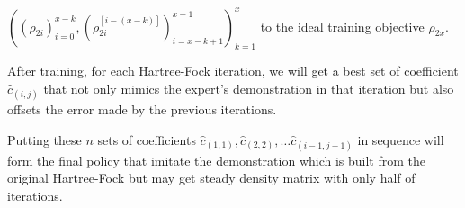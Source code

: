 \documentclass[twoside]{article}
\begin{document}
$((\rho_{2i})_{i=0}^{x-k} ,(\rho_{2i}^{[i-(x-k)]})^{x-1}_{i=x-k+1})_{k=1}^{x}$  
to the ideal training objective $\rho_{2x}$.
%

After training, for each Hartree-Fock iteration, we will get a best set of coefficient $\hat{c}_{(i,j)}$ that not only mimics the expert's demonstration in that iteration but also offsets the error made by the previous iterations.

% 
Putting these $n$ sets of coefficients $\hat{c}_{(1,1)}, \hat{c}_{(2,2)}, \ldots  \hat{c}_{(i-1,j-1)}$ in sequence will form the final policy that imitate the demonstration which is built from  the original Hartree-Fock but may get steady density matrix with only half of iterations. 

\end{document}
